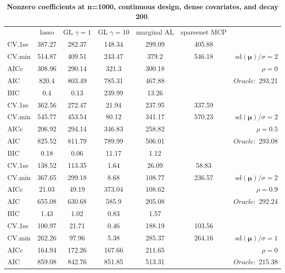 \clearpage
\begin{table}\vspace{-.5cm}
\caption[l]{ { \bf Nonzero coefficients at n=1000, continuous design, 
dense covariates, and  decay  200}.}
\vspace{-.5cm}
\footnotesize{}
\begin{center}
\begin{tabular}{l*{5}{c}|r}
& lasso & GL $\gamma=1$ & GL $\gamma=10$ & marginal AL & sparsenet MCP  & \\
 \cline{1-7}
CV.1se & 387.27 & 282.37 & 148.34 & 299.09 & 405.88 & \\
CV.min & 514.87 & 409.51 & 243.47 & 379.2 & 546.18 &  $\mathrm{sd}(\mathbf{\mu})/\sigma=2$ \\
AICc & 308.96 & 290.14 & 321.3 & 300.18 & & $\rho=0$ \\
AIC & 820.4 & 803.49 & 785.31 & 467.88 & &  \multirow{2}{*}{$Oracle: $ 293.21} \\
BIC & 0.4 & 0.13 & 239.99 & 13.26 & &  \\
 \hline 
CV.1se & 362.56 & 272.47 & 21.94 & 237.95 & 337.59 & \\
CV.min & 545.77 & 453.54 & 80.12 & 341.17 & 570.23 &  $\mathrm{sd}(\mathbf{\mu})/\sigma=2$ \\
AICc & 206.92 & 294.14 & 346.83 & 258.82 & & $\rho=0.5$ \\
AIC & 825.52 & 811.79 & 789.99 & 506.01 & &  \multirow{2}{*}{$Oracle: $ 293.08} \\
BIC & 0.18 & 0.06 & 11.17 & 1.12 & &  \\
 \hline 
CV.1se & 138.52 & 113.35 & 1.64 & 26.09 & 58.83 & \\
CV.min & 367.65 & 299.18 & 8.68 & 108.77 & 236.57 &  $\mathrm{sd}(\mathbf{\mu})/\sigma=2$ \\
AICc & 21.03 & 49.19 & 373.04 & 108.62 & & $\rho=0.9$ \\
AIC & 655.08 & 630.68 & 585.9 & 205.08 & &  \multirow{2}{*}{$Oracle: $ 292.24} \\
BIC & 1.43 & 1.02 & 0.83 & 1.57 & &  \\
 \hline 
CV.1se & 100.97 & 21.71 & 0.46 & 188.19 & 103.56 & \\
CV.min & 262.26 & 97.96 & 5.38 & 285.37 & 264.16 &  $\mathrm{sd}(\mathbf{\mu})/\sigma=1$ \\
AICc & 164.94 & 172.26 & 167.66 & 211.65 & & $\rho=0$ \\
AIC & 859.08 & 842.76 & 851.85 & 513.31 & &  \multirow{2}{*}{$Oracle: $ 215.38} \\

\end{tabular}
\end{center}
\end{table}
